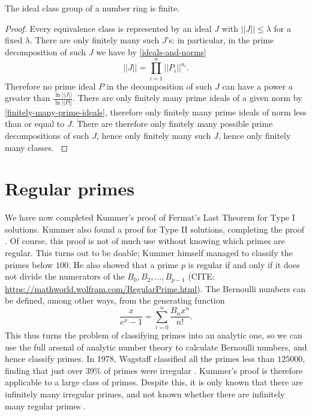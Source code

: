 \begin{theorem}
The ideal class group of a number ring is finite.
\end{theorem}
\begin{proof}
Every equivalence class is represented by an ideal $J$ with $||J||\leq \lambda$ for a fixed $\lambda.$ There are only finitely many such $J$'s: in particular, in the prime decomposition of such $J$ we have by \cref{ideals-and-norms} $$||J||=\prod_{i=1}^n ||P_i||^{a_i}.$$ Therefore no prime ideal $P$ in the decomposition of such $J$ can have a power $a$ greater than $\frac{\ln ||J||}{\ln ||P||}$. There are only finitely many prime ideals of a given norm by \cref{finitely-many-prime-ideals}, therefore only finitely many prime ideals of norm less than or equal to $J$. There are therefore only finitely many possible prime decompositions of such $J$, hence only finitely many such $J$, hence only finitely many classes.
\cite{NumberFields}
\end{proof}

\section{Regular primes}
We have now completed Kummer's proof of Fermat's Last Theorem for Type I solutions. Kummer also found a proof for Type II solutions, completing the proof \cite{Wright}. Of course, this proof is not of much use without knowing which primes are regular. This turns out to be doable; Kummer himself managed to classify the primes below $100$. He also showed that a prime $p$ is regular if and only if it does not divide the numerators of the  $B_0,B_2,\dots,B_{p-1}$ (CITE: \url{https://mathworld.wolfram.com/RegularPrime.html}). The Bernoulli numbers can be defined, among other ways, from the generating function
$$\frac{x}{e^x-1}=\sum_{i=0}^n \frac{B_nx^n}{n!}.$$ This thus turns the problem of classifying primes into an analytic one, so we can use the full arsenal of analytic number theory to calculate Bernoulli numbers, and hence classify primes. In 1978, Wagstaff classified all the primes less than $125000$, finding that just over $39\%$ of primes were irregular \cite{125000}. Kummer's proof is therefore applicable to a large class of primes. Despite this, it is only known that there are infinitely many irregular primes, and not known whether there are infinitely many regular primes \cite{125000}.